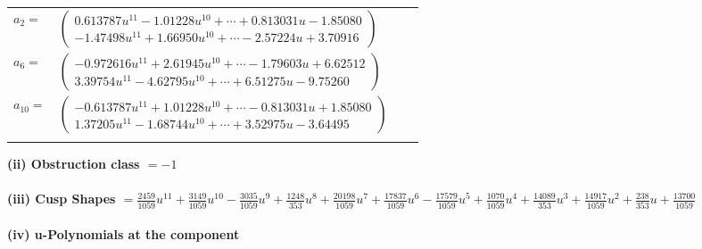 \documentclass[1p]{elsarticle_modified}
\theoremstyle{definition}
\begin{document}
\begin{tabular}{m{7pt} m{180pt} m{7pt} m{180pt} }
\flushright $a_{2}=$&$\begin{pmatrix}0.613787 u^{11}-1.01228 u^{10}+\cdots+0.813031 u-1.85080\\-1.47498 u^{11}+1.66950 u^{10}+\cdots-2.57224 u+3.70916\end{pmatrix}$ \\
\flushright $a_{6}=$&$\begin{pmatrix}-0.972616 u^{11}+2.61945 u^{10}+\cdots-1.79603 u+6.62512\\3.39754 u^{11}-4.62795 u^{10}+\cdots+6.51275 u-9.75260\end{pmatrix}$ \\
\flushright $a_{10}=$&$\begin{pmatrix}-0.613787 u^{11}+1.01228 u^{10}+\cdots-0.813031 u+1.85080\\1.37205 u^{11}-1.68744 u^{10}+\cdots+3.52975 u-3.64495\end{pmatrix}$\\&\end{tabular}
\flushleft \textbf{(ii) Obstruction class $= -1$}\\~\\
\flushleft \textbf{(iii) Cusp Shapes $= \frac{2459}{1059} u^{11}+\frac{3149}{1059} u^{10}-\frac{3035}{1059} u^9+\frac{1248}{353} u^8+\frac{20198}{1059} u^7+\frac{17837}{1059} u^6-\frac{17579}{1059} u^5+\frac{1070}{1059} u^4+\frac{14089}{353} u^3+\frac{14917}{1059} u^2+\frac{238}{353} u+\frac{13700}{1059}$}\\~\\
\newpage\renewcommand{\arraystretch}{1}
\flushleft \textbf{(iv) u-Polynomials at the component}\newline \\
\end{document}
